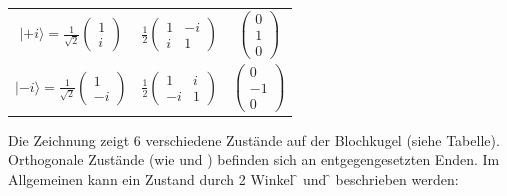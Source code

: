 \begin{minipage}{.5\textwidth}
\begin{tabular}{c|c|c}
    $|+i\rangle = \frac{1}{\sqrt{2}} \begin{pmatrix} 1 \\ i \end{pmatrix}$ &
    $\frac{1}{2} \begin{pmatrix} 1 & -i \\ i & 1 \end{pmatrix}$ &
    $\begin{pmatrix} 0 \\ 1 \\ 0 \end{pmatrix}$ \\[2ex]

    $|-i\rangle = \frac{1}{\sqrt{2}} \begin{pmatrix} 1 \\ -i \end{pmatrix}$ &
    $\frac{1}{2} \begin{pmatrix} 1 & i \\ -i & 1 \end{pmatrix}$ &
    $\begin{pmatrix} 0 \\ -1 \\ 0 \end{pmatrix}$ \\
    \bottomrule
\end{tabular}
\end{minipage}

\vspace{0.5cm}
Die Zeichnung zeigt 6 verschiedene Zustände auf der Blochkugel (siehe Tabelle). Orthogonale Zustände (wie  und ) befinden sich an entgegengesetzten Enden. Im Allgemeinen kann ein Zustand durch 2 Winkel \f{\vartheta} und \f{\varphi} beschrieben werden:

